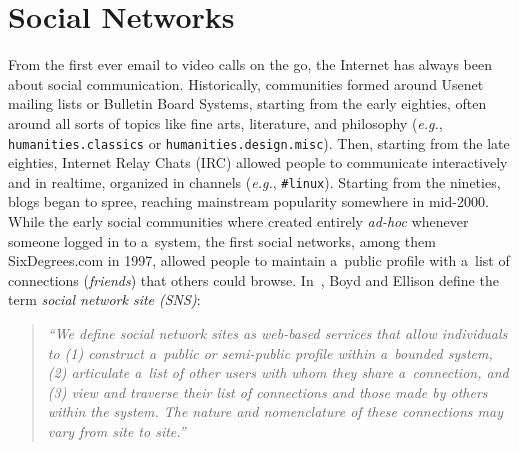 

\chapter{Social Networks} \label{cha:social-networks}

\ifpdf
    \graphicspath{{3_social_networks/figures/PNG/}{3_social_networks/figures/PDF/}{3_social_networks/figures/}}
\else
    \graphicspath{{3_social_networks/figures/EPS/}{3_social_networks/figures/}}
\fi


From the first ever email to video calls on the go,
the Internet has always been about social communication.
Historically, communities formed around Usenet mailing lists or Bulletin Board Systems,
starting from the early eighties, often around all sorts of topics like fine arts,
literature, and philosophy (\emph{e.g.}, \texttt{humanities.classics}
or \texttt{humanities.\-design.misc}).
Then, starting from the late eighties, Internet Relay Chats (IRC)
allowed people to communicate interactively and in realtime, organized in channels
(\emph{e.g.}, \texttt{\#linux}).
Starting from the nineties, blogs began to spree,
reaching mainstream popularity somewhere in mid-2000.
While the early social communities where created entirely \emph{ad-hoc} whenever someone logged in to a~system,
the first social networks, among them SixDegrees.com in 1997,
allowed people to maintain a~public profile
with a~list of connections (\emph{friends}) that others could browse.
In~\cite{Ellison2007}, Boyd and Ellison define the term \emph{social network site (SNS)}:
\begin{quotation}
\textit{``We define social network sites as web-based services that allow individuals to
(1) construct a~public or semi-public profile within a~bounded system,
(2) articulate a~list of other users with whom they share a~connection, and
(3) view and traverse their list of connections and those made by others within the system.
The nature and nomenclature of these connections may vary from site to site.''}
\end{quotation}

